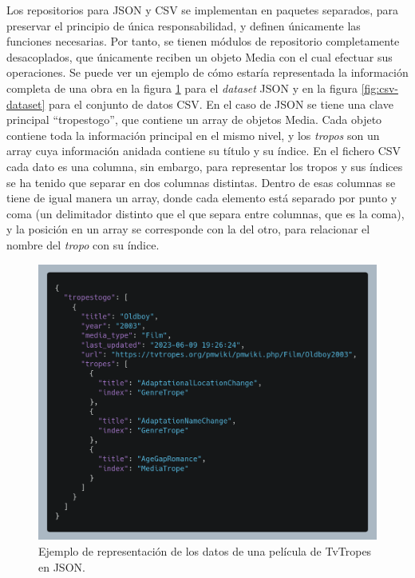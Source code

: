 Los repositorios para JSON y CSV se implementan en paquetes separados, para
preservar el principio de única responsabilidad, y definen únicamente las
funciones necesarias. Por tanto, se tienen módulos de repositorio completamente
desacoplados, que únicamente reciben un objeto Media con el cual efectuar sus
operaciones. Se puede ver un ejemplo de cómo estaría representada la información
completa de una obra en la figura \ref{fig:json-dataset} para el
\textit{dataset} JSON y en la figura \ref{fig:csv-dataset} para el conjunto de
datos CSV. En el caso de JSON se tiene una clave principal ``tropestogo'', que
contiene un array de objetos Media. Cada objeto contiene toda la información
principal en el mismo nivel, y los \textit{tropos} son un array cuya información
anidada contiene su título y su índice. En el fichero CSV cada dato es una
columna, sin embargo, para representar los tropos y sus índices se ha tenido que
separar en dos columnas distintas. Dentro de esas columnas se tiene de igual
manera un array, donde cada elemento está separado por punto y coma (un
delimitador distinto que el que separa entre columnas, que es la coma), y la
posición en un array se corresponde con la del otro, para relacionar el nombre
del \textit{tropo} con su índice.

\begin{figure}[ht]
    \includegraphics[width=\textwidth]{img/dataset-json.png}
    \caption{Ejemplo de representación de los datos de una película de TvTropes en JSON.}
    \label{fig:json-dataset}
\end{figure}


